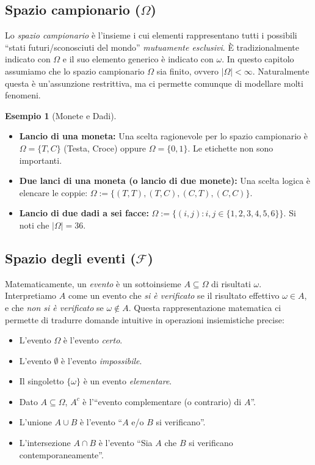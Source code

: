\documentclass[11pt, a4paper]{report}
\theoremstyle{plain}
\theoremstyle{definition}
\newtheorem{esempio}[theorem]{Esempio}
\theoremstyle{remark}
\newcommand{\F}{\mathcal{F}}
\newcommand{\1}{\mathbf{1}}
\begin{document}
\subsection{Spazio campionario \texorpdfstring{($\Omega$)}{(Omega)}}

Lo \emph{spazio campionario} è l'insieme i cui elementi rappresentano tutti i possibili ``stati futuri/sconosciuti del mondo'' \emph{mutuamente esclusivi}. È tradizionalmente indicato con $\Omega$ e il suo elemento generico è indicato con $\omega$. In questo capitolo assumiamo che lo spazio campionario $\Omega$ sia finito, ovvero $|\Omega| < \infty$. Naturalmente questa è un'assunzione restrittiva, ma ci permette comunque di modellare molti fenomeni.

\begin{esempio}[Monete e Dadi]
    \begin{itemize}
        \item \textbf{Lancio di una moneta:} Una scelta ragionevole per lo spazio campionario è $\Omega = \{T, C\}$ (Testa, Croce) oppure $\Omega = \{0, 1\}$. Le etichette non sono importanti.
        \item \textbf{Due lanci di una moneta (o lancio di due monete):} Una scelta logica è elencare le coppie: $\Omega := \{(T, T), (T, C), (C, T), (C, C)\}$.
        \item \textbf{Lancio di due dadi a sei facce:} $\Omega := \{(i, j) : i, j \in \{1, 2, 3, 4, 5, 6\}\}$. Si noti che $|\Omega| = 36$.
    \end{itemize}
\end{esempio}

\subsection{Spazio degli eventi \texorpdfstring{($\F$)}{(F)}}

Matematicamente, un \emph{evento} è un sottoinsieme $A \subseteq \Omega$ di risultati $\omega$. Interpretiamo $A$ come un evento che \emph{si è verificato} se il risultato effettivo $\omega \in A$, e che \emph{non si è verificato} se $\omega \notin A$. Questa rappresentazione matematica ci permette di tradurre domande intuitive in operazioni insiemistiche precise:
\begin{itemize}
    \item L'evento $\Omega$ è l'evento \emph{certo}.
    \item L'evento $\emptyset$ è l'evento \emph{impossibile}.
    \item Il singoletto $\{\omega\}$ è un evento \emph{elementare}.
    \item Dato $A \subseteq \Omega$, $A^c$ è l'``evento complementare (o contrario) di $A$''.
    \item L'unione $A \cup B$ è l'evento ``$A$ e/o $B$ si verificano''.
    \item L'intersezione $A \cap B$ è l'evento ``Sia $A$ che $B$ si verificano contemporaneamente''.
\end{itemize}
\end{document}
